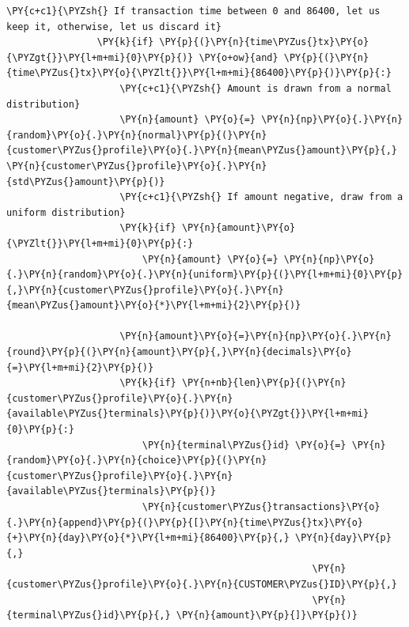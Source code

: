 \begin{tcolorbox}[breakable, size=fbox, boxrule=1pt, pad at break*=1mm,colback=cellbackground, colframe=cellborder]
\begin{Verbatim}[commandchars=\\\{\}]
                \PY{c+c1}{\PYZsh{} If transaction time between 0 and 86400, let us keep it, otherwise, let us discard it}
                \PY{k}{if} \PY{p}{(}\PY{n}{time\PYZus{}tx}\PY{o}{\PYZgt{}}\PY{l+m+mi}{0}\PY{p}{)} \PY{o+ow}{and} \PY{p}{(}\PY{n}{time\PYZus{}tx}\PY{o}{\PYZlt{}}\PY{l+m+mi}{86400}\PY{p}{)}\PY{p}{:}
                    \PY{c+c1}{\PYZsh{} Amount is drawn from a normal distribution}
                    \PY{n}{amount} \PY{o}{=} \PY{n}{np}\PY{o}{.}\PY{n}{random}\PY{o}{.}\PY{n}{normal}\PY{p}{(}\PY{n}{customer\PYZus{}profile}\PY{o}{.}\PY{n}{mean\PYZus{}amount}\PY{p}{,} \PY{n}{customer\PYZus{}profile}\PY{o}{.}\PY{n}{std\PYZus{}amount}\PY{p}{)}
                    \PY{c+c1}{\PYZsh{} If amount negative, draw from a uniform distribution}
                    \PY{k}{if} \PY{n}{amount}\PY{o}{\PYZlt{}}\PY{l+m+mi}{0}\PY{p}{:}
                        \PY{n}{amount} \PY{o}{=} \PY{n}{np}\PY{o}{.}\PY{n}{random}\PY{o}{.}\PY{n}{uniform}\PY{p}{(}\PY{l+m+mi}{0}\PY{p}{,}\PY{n}{customer\PYZus{}profile}\PY{o}{.}\PY{n}{mean\PYZus{}amount}\PY{o}{*}\PY{l+m+mi}{2}\PY{p}{)}

                    \PY{n}{amount}\PY{o}{=}\PY{n}{np}\PY{o}{.}\PY{n}{round}\PY{p}{(}\PY{n}{amount}\PY{p}{,}\PY{n}{decimals}\PY{o}{=}\PY{l+m+mi}{2}\PY{p}{)}
                    \PY{k}{if} \PY{n+nb}{len}\PY{p}{(}\PY{n}{customer\PYZus{}profile}\PY{o}{.}\PY{n}{available\PYZus{}terminals}\PY{p}{)}\PY{o}{\PYZgt{}}\PY{l+m+mi}{0}\PY{p}{:}
                        \PY{n}{terminal\PYZus{}id} \PY{o}{=} \PY{n}{random}\PY{o}{.}\PY{n}{choice}\PY{p}{(}\PY{n}{customer\PYZus{}profile}\PY{o}{.}\PY{n}{available\PYZus{}terminals}\PY{p}{)}
                        \PY{n}{customer\PYZus{}transactions}\PY{o}{.}\PY{n}{append}\PY{p}{(}\PY{p}{[}\PY{n}{time\PYZus{}tx}\PY{o}{+}\PY{n}{day}\PY{o}{*}\PY{l+m+mi}{86400}\PY{p}{,} \PY{n}{day}\PY{p}{,}
                                                      \PY{n}{customer\PYZus{}profile}\PY{o}{.}\PY{n}{CUSTOMER\PYZus{}ID}\PY{p}{,}
                                                      \PY{n}{terminal\PYZus{}id}\PY{p}{,} \PY{n}{amount}\PY{p}{]}\PY{p}{)}


\end{Verbatim}
\end{tcolorbox}
